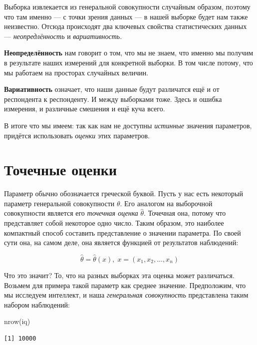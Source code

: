 \documentclass[
  letterpaper,
  DIV=11,
  numbers=noendperiod]{scrreprt}
\newenvironment{Shaded}{}{}
\newcommand{\FunctionTok}[1]{\textcolor[rgb]{0.44,0.26,0.76}{#1}}
\newcommand{\NormalTok}[1]{\textcolor[rgb]{0.14,0.16,0.18}{#1}}
\theoremstyle{definition}
\theoremstyle{remark}
\begin{document}
Выборка извлекается из генеральной совокупности случайным образом,
поэтому что там именно --- с точки зрения данных --- в нашей выборке
будет нам также неизвестно. Отсюда происходят два ключевых свойства
статистических данных --- \emph{неопредлённость} и \emph{вариативность}.

\textbf{Неопределённость} нам говорит о том, что мы не знаем, что именно
мы получим в результате наших измерений для конкретной выборки. В том
числе потому, что мы работаем на просторах случайных величин.

\textbf{Вариативность} означает, что наши данные будут различатся ещё и
от респондента к респонденту. И между выборками тоже. Здесь и ошибка
измерения, и различные смешения и ещё куча всего.

В итоге что мы имеем: так как нам не доступны \emph{истинные} значения
параметров, придётся использовать \emph{оценки} этих параметров.

\section{Точечные
оценки}\label{ux442ux43eux447ux435ux447ux43dux44bux435-ux43eux446ux435ux43dux43aux438}

Параметр обычно обозначается греческой буквой. Пусть у нас есть
некоторый параметр генеральной совокупности \(\theta\). Его аналогом на
выборочной совокупности является его \emph{точечная оценка}
\(\hat \theta\). Точечная она, потому что представляет собой некоторое
одно число. Таким образом, это наиболее компактный способ составить
представление о значении параметра. По своей сути она, на самом деле,
она является функцией от результатов наблюдений:

\[
\hat \theta = \hat \theta (x), \; x = (x_1, x_2, \dots, x_n)
\]

Что это значит? То, что на разных выборках эта оценка может различаться.
Возьмем для примера такой параметр как среднее значение. Предположим,
что мы исследуем интеллект, и наша \emph{генеральная совокупность}
представлена таким набором наблюдений:

\begin{Shaded}
\begin{Highlighting}[]
\FunctionTok{nrow}\NormalTok{(iq)}
\end{Highlighting}
\end{Shaded}

\begin{verbatim}
[1] 10000
\end{verbatim}
\end{document}
